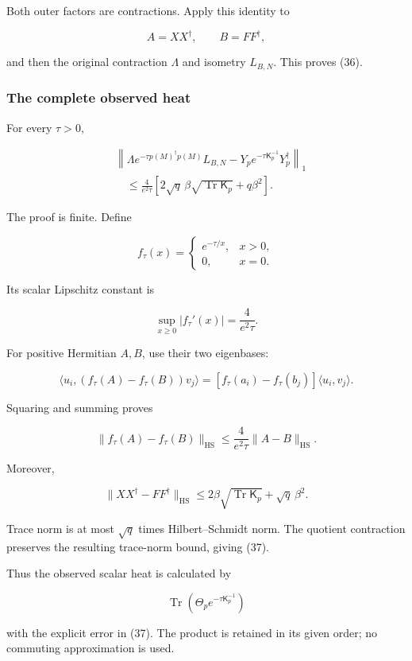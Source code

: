 \documentclass[11pt]{article}
\begin{document}
Both outer factors are contractions. Apply this identity to

\[
A=XX^\dagger,\qquad B=FF^\dagger,
\]

and then the original contraction \(\Lambda\) and isometry \(L_{B,N}\). This proves (36).

\subsubsection{The complete observed heat}\label{the-complete-observed-heat}

For every \(\tau>0\),

\[
\boxed{
\begin{aligned}
&\left\|
\Lambda e^{-\tau p(M)^\dagger p(M)}L_{B,N}
-
Y_pe^{-\tau\mathsf K_p^{-1}}Y_p^\dagger
\right\|_1\\
&\quad\le
\frac{4}{e^2\tau}
\left[
2\sqrt q\,\beta\sqrt{\operatorname{Tr}\mathsf K_p}
+q\beta^2
\right].
\end{aligned}
}
\tag{37}
\]

The proof is finite. Define

\[
f_\tau(x)=
\begin{cases}
e^{-\tau/x},&x>0,\\
0,&x=0.
\end{cases}
\]

Its scalar Lipschitz constant is

\[
\sup_{x\ge0}|f_\tau'(x)|=\frac4{e^2\tau}.
\]

For positive Hermitian \(A,B\), use their two eigenbases:

\[
\langle u_i,(f_\tau(A)-f_\tau(B))v_j\rangle
=
[f_\tau(a_i)-f_\tau(b_j)]\langle u_i,v_j\rangle.
\]

Squaring and summing proves

\[
\|f_\tau(A)-f_\tau(B)\|_{\mathrm{HS}}
\le\frac4{e^2\tau}\|A-B\|_{\mathrm{HS}}.
\]

Moreover,

\[
\|XX^\dagger-FF^\dagger\|_{\mathrm{HS}}
\le2\beta\sqrt{\operatorname{Tr}\mathsf K_p}
+\sqrt q\,\beta^2.
\]

Trace norm is at most \(\sqrt q\) times Hilbert--Schmidt norm. The quotient contraction preserves the resulting trace-norm bound, giving (37).

Thus the observed scalar heat is calculated by

\[
\boxed{
\operatorname{Tr}
\left(\Theta_p e^{-\tau\mathsf K_p^{-1}}\right)
}
\tag{38}
\]

with the explicit error in (37). The product is retained in its given order; no commuting approximation is used.
\end{document}
